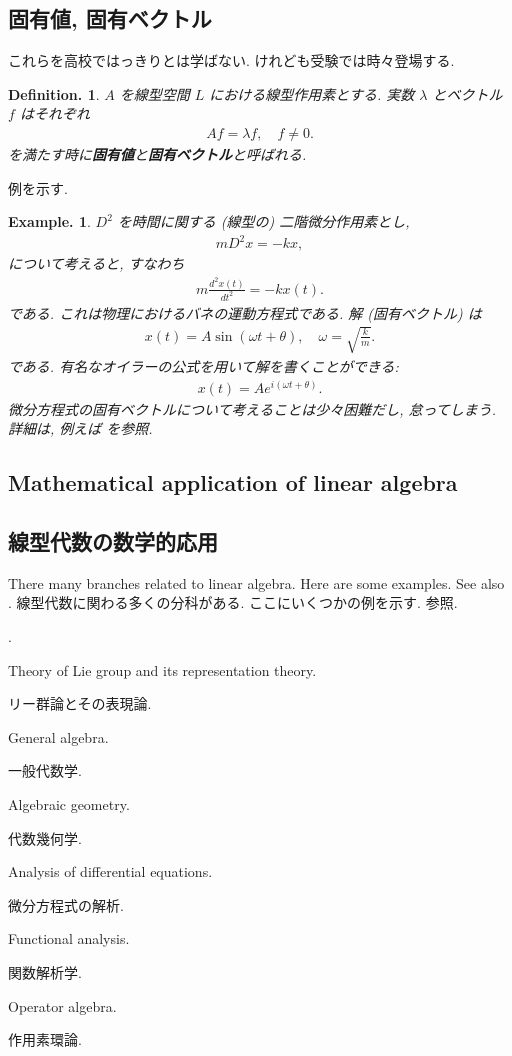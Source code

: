 \documentclass[openany, a4paper, oneside]{jsbook}
\newcounter{enum2}
\renewenvironment{enumerate}{%
\begin{list}%
{%
\arabic{enum2}.\ \,%
}%
{%
\usecounter{enum2}
\setlength{\itemindent}{0pt}%
\setlength{\leftmargin}{15pt}%
\setlength{\rightmargin}{0pt}%
\setlength{\labelsep}{0pt}%
\setlength{\labelwidth}{6pt}%
\setlength{\itemsep}{0pt}%
\setlength{\parsep}{0pt}%
\setlength{\listparindent}{0pt}%
}
}{%
\end{list}%
}
\theoremstyle{break}
\theoremstyle{breakdefn}
\newtheorem{defn}[thm]{Definition.}
\newtheorem{ex}[thm]{Example.}
\newcommand{\rbk}[1]{\left (#1\right)}
\newcommand{\upbf}[1]{\textup{\textbf{#1}}}
\begin{document}
\subsection{固有値, 固有ベクトル}


これらを高校ではっきりとは学ばない.
けれども受験では時々登場する.
\begin{defn}
 $A$ を線型空間 $L$ における線型作用素とする.
 実数 $\lambda$ とベクトル $f$ はそれぞれ
 \begin{align}
  A f = \lambda f, \quad
  f \neq 0.
 \end{align}
 を満たす時に\upbf{固有値}と\upbf{固有ベクトル}と呼ばれる.
\end{defn}
例を示す.
\begin{ex}
 $D^2$ を時間に関する (線型の) 二階微分作用素とし,
  \begin{align}
   m D^2 x
   =
   -k x,
  \end{align}
 について考えると, すなわち
  \begin{align}
   m \frac{d^2 x (t)}{dt^2}
   =
   -k x(t).
  \end{align}
 である.
 これは物理におけるバネの運動方程式である.
 解 (固有ベクトル) は
  \begin{align}
   x(t)
   =
   A \sin \rbk{\omega t + \theta}, \quad
   \omega
   =
   \sqrt{\frac{k}{m}}.
  \end{align}
 である.
 有名なオイラーの公式を用いて解を書くことができる:
  \begin{align}
   x(t)
   =
   A e^{i \rbk{\omega t + \theta}}.
  \end{align}
 微分方程式の固有ベクトルについて考えることは少々困難だし, 怠ってしまう.
 詳細は, 例えば \cite{HaimBrezis1, HaimBrezis2} を参照.
\end{ex}
\subsection{Mathematical application of linear algebra}
\subsection{線型代数の数学的応用}


There many branches related to linear algebra.
Here are some examples.
See also \cite{phasetr2}.
線型代数に関わる多くの分科がある.
ここにいくつかの例を示す.
\cite{phasetr2} 参照.
\begin{enumerate}
\item Theory of Lie group and its representation theory.
\item リー群論とその表現論.
\item General algebra.
\item 一般代数学.
\item Algebraic geometry.
\item 代数幾何学.
\item Analysis of differential equations.
\item 微分方程式の解析.
\item Functional analysis.
\item 関数解析学.
\item Operator algebra.
\item 作用素環論.
\end{enumerate}
\end{document}
